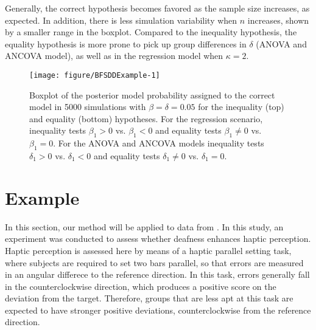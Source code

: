 \documentclass[11pt,a4paper]{article}\usepackage[]{graphicx}\usepackage[]{color}
\makeatletter
\def\maxwidth{ %
  \ifdim\Gin@nat@width>\linewidth
    \linewidth
  \else
    \Gin@nat@width
  \fi
}
\newenvironment{knitrout}{}{} %
\makeatother
\begin{document}
Generally, the correct hypothesis becomes favored as the sample size increases, as expected. In addition, there is less simulation variability when \( n \) increases, shown by a smaller range in the boxplot. Compared to the inequality hypothesis, the equality hypothesis is more prone to pick up group differences in \( \delta \) (ANOVA and ANCOVA model), as well as in the regression model when \( \kappa = 2.\)

\begin{figure}
\begin{knitrout}
\color{fgcolor}
\texttt{[image: figure/BFSDDExample-1]} 

\end{knitrout}
\caption{Boxplot of the posterior model probability assigned to the correct model in 5000 simulations with \( \beta = \delta = 0.05 \) for the inequality (top) and equality (bottom) hypotheses. For the regression scenario, inequality tests \( \beta_1 > 0 \) vs. \( \beta_1 < 0 \) and equality tests \( \beta_1 \neq 0 \) vs. \( \beta_1 = 0 \). For the ANOVA and ANCOVA models inequality tests \( \delta_1 > 0 \) vs. \( \delta_1 < 0 \) and equality tests \( \delta_1 \neq 0 \) vs. \( \delta_1 = 0 \).}
\label{BFSimStud}
\end{figure}











\section{Example}

\label{example}

In this section, our method will be applied to data from \citet{van2013superior}. In this study, an experiment was conducted to assess whether deafness enhances haptic perception. Haptic perception is assessed here by means of a haptic parallel setting task, where subjects are required to set two bars parallel, so that errors are measured in an angular differece to the reference direction. In this task, errors generally fall in the counterclockwise direction, which produces a positive score on the deviation from the target. Therefore, groups that are less apt at this task are expected to have stronger positive deviations, counterclockwise from the reference direction.
\end{document}
